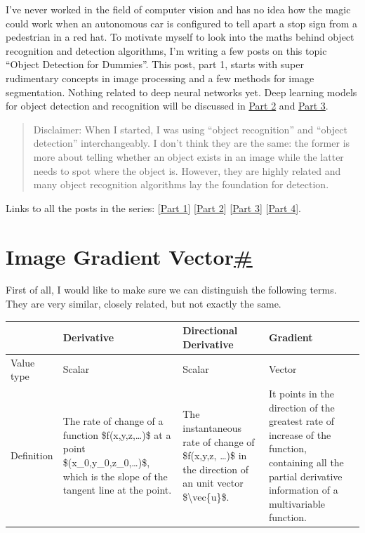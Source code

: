 I've never worked in the field of computer vision and has no idea how the magic could work when an autonomous car is configured to tell apart a stop sign from a pedestrian in a red hat. To motivate myself to look into the maths behind object recognition and detection algorithms, I'm writing a few posts on this topic ``Object Detection for Dummies''. This post, part 1, starts with super rudimentary concepts in image processing and a few methods for image segmentation. Nothing related to deep neural networks yet. Deep learning models for object detection and recognition will be discussed in \href{https://lilianweng.github.io/posts/2017-12-15-object-recognition-part-2/}{Part 2} and \href{https://lilianweng.github.io/posts/2017-12-31-object-recognition-part-3/}{Part 3}.

\begin{quote}
Disclaimer: When I started, I was using ``object recognition'' and ``object detection'' interchangeably. I don't think they are the same: the former is more about telling whether an object exists in an image while the latter needs to spot where the object is. However, they are highly related and many object recognition algorithms lay the foundation for detection.
\end{quote}

Links to all the posts in the series: {[}\href{https://lilianweng.github.io/posts/2017-10-29-object-recognition-part-1/}{Part 1}{]} {[}\href{https://lilianweng.github.io/posts/2017-12-15-object-recognition-part-2/}{Part 2}{]} {[}\href{https://lilianweng.github.io/posts/2017-12-31-object-recognition-part-3/}{Part 3}{]} {[}\href{https://lilianweng.github.io/posts/2018-12-27-object-recognition-part-4/}{Part 4}{]}.

\section{\texorpdfstring{Image Gradient Vector\hyperref[image-gradient-vector]{\#}}{Image Gradient Vector\#}}\label{image-gradient-vector}

First of all, I would like to make sure we can distinguish the following terms. They are very similar, closely related, but not exactly the same.

\begin{longtable}[]{@{}llll@{}}
\toprule\noalign{}
& \textbf{Derivative} & \textbf{Directional Derivative} & \textbf{Gradient} \\
\midrule\noalign{}
\endhead
\bottomrule\noalign{}
\endlastfoot
Value type & Scalar & Scalar & Vector \\
Definition & The rate of change of a function \$f(x,y,z,\ldots)\$ at a point \$(x\_0,y\_0,z\_0,\ldots)\$, which is the slope of the tangent line at the point. & The instantaneous rate of change of \$f(x,y,z, \ldots)\$ in the direction of an unit vector \$\textbackslash vec\{u\}\$. & It points in the direction of the greatest rate of increase of the function, containing all the partial derivative information of a multivariable function. \\
\end{longtable}


